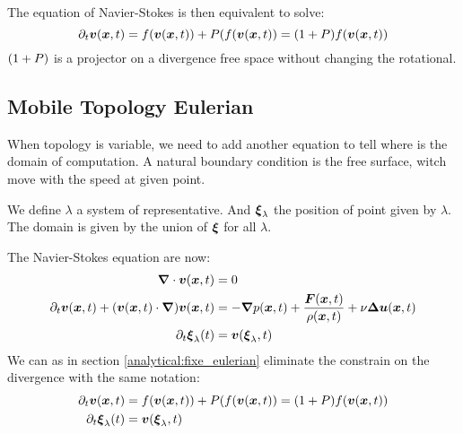 The equation of Navier-Stokes is then equivalent to solve:
\begin{equation}
  \partial_t {\boldsymbol {v}}({\boldsymbol {x}} ,t)=f({\boldsymbol {v}}({\boldsymbol {x}},t))+P(f({\boldsymbol {v}}({\boldsymbol {x}},t))=(1+P)f({\boldsymbol {v}}({\boldsymbol {x}},t))
\end{equation}
$(1+P)$ is a projector on a divergence free space without changing the rotational.

\subsection{Mobile Topology Eulerian}
When topology is variable, we need to add another equation to tell where is the domain of computation.
A natural boundary condition is the free surface, witch move with the speed at given point.

We define $\lambda$ a system of representative. And ${\boldsymbol {\xi}}_{\lambda}$ the position of point given by $\lambda$.
The domain is given by the union of ${\boldsymbol {\xi}}$ for all $\lambda$.

The Navier-Stokes equation are now:
\begin{subequations}
\begin{align}
\label{analytical:navierStokesMobA}
{\boldsymbol {\nabla}} \cdot {\boldsymbol {v}}({\boldsymbol {x}} ,t)&=0\\
\label{analytical:navierStokesMobB}
\partial_t {\boldsymbol {v}}({\boldsymbol {x}} ,t)+({\boldsymbol {v}}({\boldsymbol {x}},t)\cdot{\boldsymbol {\nabla}} ) {\boldsymbol {v}}({\boldsymbol {x}} ,t)&=-{\boldsymbol {\nabla}} p({\boldsymbol {x}},t)+\frac{{\boldsymbol {F}}({\boldsymbol {x}},t)}{\rho({\boldsymbol {x}},t)}+\nu {\boldsymbol {\Delta}} {\boldsymbol {u}}({\boldsymbol {x}},t)\\
\partial_t {\boldsymbol {\xi}}_{\lambda}(t)&={\boldsymbol {v}}({\boldsymbol {\xi}}_{\lambda},t)
\end{align}
\end{subequations}
We can as in section \ref{analytical:fixe_eulerian} eliminate the constrain on the divergence with the same notation:
\begin{subequations}
\begin{align}
\partial_t {\boldsymbol {v}}({\boldsymbol {x}} ,t)&=f({\boldsymbol {v}}({\boldsymbol {x}},t))+P(f({\boldsymbol {v}}({\boldsymbol {x}},t))=(1+P)f({\boldsymbol {v}}({\boldsymbol {x}},t))\\
\partial_t {\boldsymbol {\xi}}_{\lambda}(t)&={\boldsymbol {v}}({\boldsymbol {\xi}}_{\lambda},t)\label{ana:move:equ}
\end{align}
\end{subequations}

